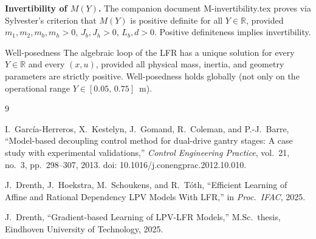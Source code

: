 \documentclass[11pt]{article}
\newcommand{\R}{\mathbb{R}}
\begin{document}
\medskip
\noindent\textbf{Invertibility of $M(Y)$.}
The companion document M-invertibility.tex proves via Sylvester's criterion that
$M(Y)$ is positive definite for all $Y \in \R$, provided
$m_1, m_2, m_b, m_h > 0$, $J_b, J_h > 0$, $L_b, d > 0$.
Positive definiteness implies invertibility.

\medskip
\begin{resultbox}{Well-posedness}
    The algebraic loop of the LFR has a unique solution for every $Y \in \R$ and every
    $(x, u)$, provided all physical mass, inertia, and geometry parameters are
    strictly positive.
    Well-posedness holds globally (not only on the operational range $Y \in [0.05,\,0.75]$~m).
\end{resultbox}

\newpage
\begin{thebibliography}{9}

I.~Garc{\'i}a-Herreros, X.~Kestelyn, J.~Gomand, R.~Coleman, and P.-J.~Barre,
``Model-based decoupling control method for dual-drive gantry stages:
A case study with experimental validations,''
\textit{Control Engineering Practice}, vol.~21, no.~3, pp.~298--307, 2013.
doi: 10.1016/j.conengprac.2012.10.010.

J.~Drenth, J.~Hoekstra, M.~Schoukens, and R.~T{\'o}th,
``Efficient Learning of Affine and Rational Dependency LPV Models With LFR,''
in \textit{Proc.\ IFAC}, 2025.

J.~Drenth,
``Gradient-based Learning of LPV-LFR Models,''
M.Sc.\ thesis, Eindhoven University of Technology, 2025.

\end{thebibliography}
\end{document}
